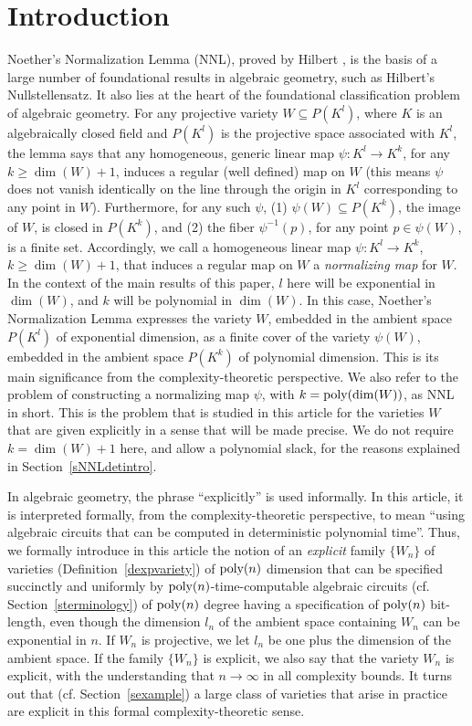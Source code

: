 \documentclass[11pt]{article}
\begin{document}
\section{Introduction} \label{sintro} 
Noether's Normalization Lemma (NNL), proved by Hilbert \cite{hilbert}, is the basis of 
a large number of foundational
results in algebraic geometry, such as  Hilbert's Nullstellensatz. It also lies at the heart of the foundational 
classification problem of algebraic geometry.
For any  projective variety  $W \subseteq P(K^l)$, 
where $K$ is an algebraically closed field   and $P(K^l)$ is 
the projective space associated with $K^l$, the  lemma  says 
that any homogeneous, generic linear map $\psi: K^l \rightarrow K^k$, for any $k \ge \dim(W)+1$, 
induces a regular (well defined) map  on $W$ (this means $\psi$ does not vanish identically on the line through the origin
in $K^l$ corresponding
to any  point in $W$). Furthermore, for any such $\psi$, (1)
$\psi(W) \subseteq P(K^k)$, the image of $W$, is closed in $P(K^k)$, and (2)
the fiber $\psi^{-1}(p)$, for any point $p \in \psi(W)$, is a finite set. 
Accordingly, we call a  homogeneous linear map $\psi: K^l \rightarrow K^k$, $k\ge \dim(W)+1$, that induces 
a regular map on $W$
a {\em normalizing map} for $W$.
In the  context of the main results of this paper, $l$ here will be   exponential in $\dim(W)$, and  $k$ will be polynomial in $\dim(W)$.
In this case,  Noether's Normalization Lemma 
expresses the variety $W$, embedded in the ambient space $P(K^l)$ of exponential dimension, as 
a finite cover of the variety $\psi(W)$,
embedded in the ambient space $P(K^k)$ of polynomial dimension.
This is its main significance from the complexity-theoretic perspective.
We also  refer to the problem of  constructing a normalizing map $\psi$,  with $k={\mbox {poly}}(\dim(W))$,
as NNL in short. 
This is the problem that is studied in this article for the
varieties $W$ that are  given explicitly in a sense that will be made precise.
We do not require $k=\dim(W)+1$ here, and allow a polynomial slack,  for the reasons explained  in Section~\ref{sNNLdetintro}.

In algebraic geometry, the phrase ``explicitly'' is used  informally. 
In this article, it is 
interpreted formally, from the complexity-theoretic perspective, to mean
``using algebraic circuits that can be computed in deterministic polynomial time''.
Thus, we formally introduce in this article the notion of an {\em explicit}
family 
$\{W_n\}$ of 
varieties (Definition~\ref{dexpvariety}) of ${\mbox {poly}}(n)$
dimension 
that can be specified succinctly and uniformly by ${\mbox {poly}}(n)$-time-computable 
algebraic circuits (cf. Section~\ref{sterminology}) 
of ${\mbox {poly}}(n)$ degree having a specification of 
${\mbox {poly}}(n)$ bit-length, 
even though the dimension $l_n$ of the ambient space  containing $W_n$ 
can be  exponential in $n$. If $W_n$ is projective,  we let $l_n$  be one plus   the dimension of the ambient space.
If the family $\{W_n\}$ is explicit,  we also 
say that the variety $W_n$ is explicit, with the understanding that
$n\rightarrow \infty$ in all complexity bounds.
It turns out that (cf. Section~\ref{sexample}) a large class of varieties that arise in practice
are  explicit in this formal complexity-theoretic sense.
\end{document}
